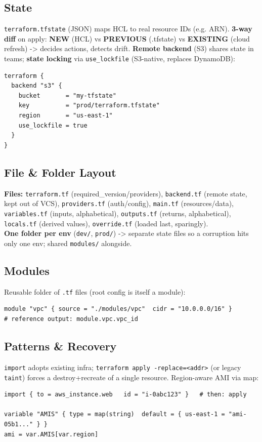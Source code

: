 \subsection{State}
\texttt{terraform.tfstate} (JSON) maps HCL to real resource IDs (e.g. ARN). \textbf{3-way diff} on apply: \textbf{NEW} (HCL) vs \textbf{PREVIOUS} (.tfstate) vs \textbf{EXISTING} (cloud refresh) -> decides actions, detects drift. \textbf{Remote backend} (S3) shares state in teams; \textbf{state locking} via \texttt{use\_lockfile} (S3-native, replaces DynamoDB):
\begin{lstlisting}[language=hcl]
terraform {
  backend "s3" {
    bucket       = "my-tfstate"
    key          = "prod/terraform.tfstate"
    region       = "us-east-1"
    use_lockfile = true
  }
}
\end{lstlisting}
\subsection{File \& Folder Layout}
\textbf{Files:} \texttt{terraform.tf} (required\_version/providers), \texttt{backend.tf} (remote state, kept out of VCS), \texttt{providers.tf} (auth/config), \texttt{main.tf} (resources/data), \texttt{variables.tf} (inputs, alphabetical), \texttt{outputs.tf} (returns, alphabetical), \texttt{locals.tf} (derived values), \texttt{override.tf} (loaded last, sparingly). \\
\textbf{One folder per env} (\texttt{dev/}, \texttt{prod/}) -> separate state files so a corruption hits only one env; shared \texttt{modules/} alongside.
\subsection{Modules}
Reusable folder of \texttt{.tf} files (root config is itself a module):
\begin{lstlisting}[language=hcl]
module "vpc" { source = "./modules/vpc"  cidr = "10.0.0.0/16" }
# reference output: module.vpc.vpc_id
\end{lstlisting}
\subsection{Patterns \& Recovery}
\texttt{import} adopts existing infra; \texttt{terraform apply -replace=<addr>} (or legacy \texttt{taint}) forces a destroy+recreate of a single resource. Region-aware AMI via map:
\begin{lstlisting}[language=hcl]
import { to = aws_instance.web   id = "i-0abc123" }   # then: apply

variable "AMIS" { type = map(string)  default = { us-east-1 = "ami-05b1..." } }
ami = var.AMIS[var.region]
\end{lstlisting}
